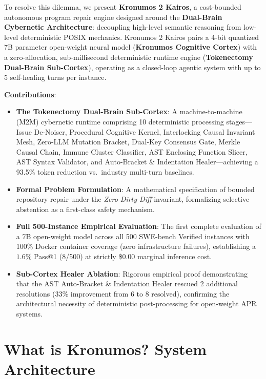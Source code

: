 \documentclass[10pt,twocolumn,letterpaper]{article}
\begin{document}
To resolve this dilemma, we present \textbf{Kronumos 2 Kairos}, a cost-bounded autonomous program repair engine designed around the \textbf{Dual-Brain Cybernetic Architecture}: decoupling high-level semantic reasoning from low-level deterministic POSIX mechanics. Kronumos 2 Kairos pairs a 4-bit quantized 7B parameter open-weight neural model (\textbf{Kronumos Cognitive Cortex}) with a zero-allocation, sub-millisecond deterministic runtime engine (\textbf{Tokenectomy Dual-Brain Sub-Cortex}), operating as a closed-loop agentic system with up to 5 self-healing turns per instance.

\noindent \textbf{Contributions}:
\begin{itemize}
    \item \textbf{The Tokenectomy Dual-Brain Sub-Cortex}: A machine-to-machine (M2M) cybernetic runtime comprising 10 deterministic processing stages---Issue De-Noiser, Procedural Cognitive Kernel, Interlocking Causal Invariant Mesh, Zero-LLM Mutation Bracket, Dual-Key Consensus Gate, Merkle Causal Chain, Immune Cluster Classifier, AST Enclosing Function Slicer, AST Syntax Validator, and Auto-Bracket \& Indentation Healer---achieving a 93.5\% token reduction vs.\ industry multi-turn baselines.
    \item \textbf{Formal Problem Formulation}: A mathematical specification of bounded repository repair under the \textit{Zero Dirty Diff} invariant, formalizing selective abstention as a first-class safety mechanism.
    \item \textbf{Full 500-Instance Empirical Evaluation}: The first complete evaluation of a 7B open-weight model across all 500 SWE-bench Verified instances with 100\% Docker container coverage (zero infrastructure failures), establishing a $1.6\%$ Pass@1 (8/500) at strictly \$0.00 marginal inference cost.
    \item \textbf{Sub-Cortex Healer Ablation}: Rigorous empirical proof demonstrating that the AST Auto-Bracket \& Indentation Healer rescued 2 additional resolutions (33\% improvement from 6 to 8 resolved), confirming the architectural necessity of deterministic post-processing for open-weight APR systems.
\end{itemize}

\section{What is Kronumos? System Architecture}
\end{document}
